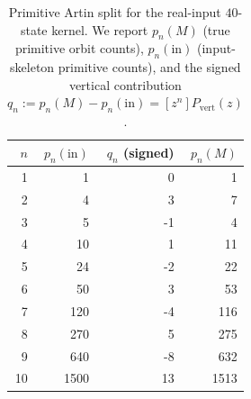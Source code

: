 \begin{table}[H]
\centering
\scriptsize
\setlength{\tabcolsep}{6pt}
\caption{Primitive Artin split for the real-input $40$-state kernel. We report $p_n(M)$ (true primitive orbit counts), $p_n(\mathrm{in})$ (input-skeleton primitive counts), and the signed vertical contribution $q_n:=p_n(M)-p_n(\mathrm{in})=[z^n]P_{\mathrm{vert}}(z)$.}
\label{tab:real_input_40_primitive_artin_split}
\begin{tabular}{r r r r}
\toprule
$n$ & $p_n(\mathrm{in})$ & $q_n$ (signed) & $p_n(M)$\\
\midrule
1 & 1 & 0 & 1\\
2 & 4 & 3 & 7\\
3 & 5 & -1 & 4\\
4 & 10 & 1 & 11\\
5 & 24 & -2 & 22\\
6 & 50 & 3 & 53\\
7 & 120 & -4 & 116\\
8 & 270 & 5 & 275\\
9 & 640 & -8 & 632\\
10 & 1500 & 13 & 1513\\
\bottomrule
\end{tabular}
\end{table}
